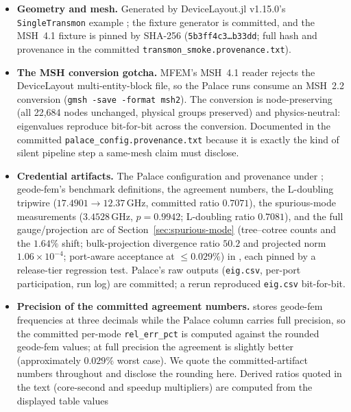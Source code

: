 \documentclass{anvil-paper}
\begin{document}
\begin{itemize}
  \item \textbf{Geometry and mesh.} Generated by DeviceLayout.jl
    v1.15.0's \texttt{SingleTransmon} example \citep{devicelayout}; the
    fixture generator is committed, and the MSH~4.1 fixture is pinned by
    SHA-256 (\texttt{5b3ff4c3\ldots{}b33dd}; full hash and provenance in
    the committed \texttt{transmon\_smoke.provenance.txt}).
  \item \textbf{The MSH conversion gotcha.} MFEM's MSH~4.1 reader
    rejects the DeviceLayout multi-entity-block file, so the Palace runs
    consume an MSH~2.2 conversion (\texttt{gmsh -save -format msh2}).
    The conversion is node-preserving (all 22{,}684 nodes unchanged,
    physical groups preserved) and physics-neutral: eigenvalues
    reproduce bit-for-bit across the conversion. Documented in the
    committed \texttt{palace\_config.provenance.txt} because it is
    exactly the kind of silent pipeline step a same-mesh claim must
    disclose.
  \item \textbf{Credential artifacts.} The Palace configuration and
    provenance under ;
    geode-fem's benchmark definitions, the agreement numbers, the
    L-doubling tripwire ($17.4901 \to 12.37$\,GHz, committed ratio
    $0.7071$), the spurious-mode measurements ($3.4528$\,GHz,
    $p = 0.9942$; L-doubling ratio $0.7081$), and the full
    gauge/projection arc of Section~\ref{sec:spurious-mode}
    (tree--cotree counts and the $1.64\%$ shift; bulk-projection
    divergence ratio $50.2$ and projected norm $1.06\times10^{-4}$;
    port-aware acceptance at $\leq 0.029\%$) in
    , each pinned by a
    release-tier regression test. Palace's raw outputs
    (\texttt{eig.csv}, per-port participation, run log) are committed;
    a rerun reproduced \texttt{eig.csv} bit-for-bit.
  \item \textbf{Precision of the committed agreement numbers.}
     stores geode-fem
    frequencies at three decimals while the Palace column carries full
    precision, so the committed per-mode \texttt{rel\_err\_pct} is
    computed against the rounded geode-fem values; at full precision the
    agreement is slightly better (approximately $0.029\%$ worst case).
    We quote the committed-artifact numbers throughout and disclose the
    rounding here. Derived ratios quoted in the text (core-second and
    speedup multipliers) are computed from the displayed table values

\end{itemize}
\end{document}
